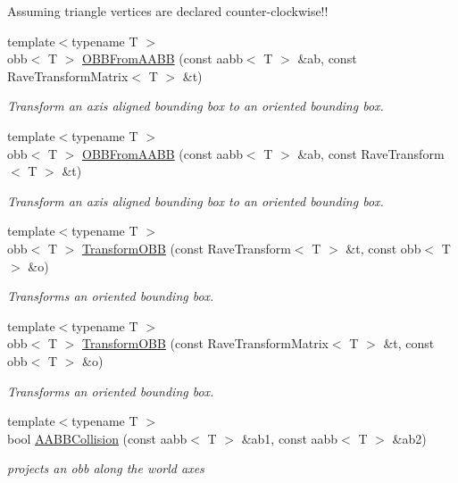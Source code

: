 \begin{DoxyCompactItemize}
\begin{DoxyCompactList}
Assuming triangle vertices are declared counter-\/clockwise!! \item\end{DoxyCompactList}\item 
{\footnotesize template$<$typename T $>$ }\\obb$<$ T $>$ \hyperlink{group__geometric__primitives_ga1aaf2360c518e6a9106315a87aaec95d}{OBBFromAABB} (const aabb$<$ T $>$ \&ab, const RaveTransformMatrix$<$ T $>$ \&t)
\begin{DoxyCompactList}\small\item\em Transform an axis aligned bounding box to an oriented bounding box. \item\end{DoxyCompactList}\item 
{\footnotesize template$<$typename T $>$ }\\obb$<$ T $>$ \hyperlink{group__geometric__primitives_ga645564c4c561b14b14b90d6d02c0e766}{OBBFromAABB} (const aabb$<$ T $>$ \&ab, const RaveTransform$<$ T $>$ \&t)
\begin{DoxyCompactList}\small\item\em Transform an axis aligned bounding box to an oriented bounding box. \item\end{DoxyCompactList}\item 
{\footnotesize template$<$typename T $>$ }\\obb$<$ T $>$ \hyperlink{group__geometric__primitives_ga94bf61739c3a0110d5230da07bde8b37}{TransformOBB} (const RaveTransform$<$ T $>$ \&t, const obb$<$ T $>$ \&o)
\begin{DoxyCompactList}\small\item\em Transforms an oriented bounding box. \item\end{DoxyCompactList}\item 
{\footnotesize template$<$typename T $>$ }\\obb$<$ T $>$ \hyperlink{group__geometric__primitives_ga588d811884a84cddef8910f749dc5aee}{TransformOBB} (const RaveTransformMatrix$<$ T $>$ \&t, const obb$<$ T $>$ \&o)
\begin{DoxyCompactList}\small\item\em Transforms an oriented bounding box. \item\end{DoxyCompactList}\item 
{\footnotesize template$<$typename T $>$ }\\bool \hyperlink{group__geometric__primitives_gaa3201f1b56aca79d1fd12499f5c66e50}{AABBCollision} (const aabb$<$ T $>$ \&ab1, const aabb$<$ T $>$ \&ab2)
\begin{DoxyCompactList}\small\item\em projects an obb along the world axes \item\end{DoxyCompactList}\end{DoxyCompactItemize}

